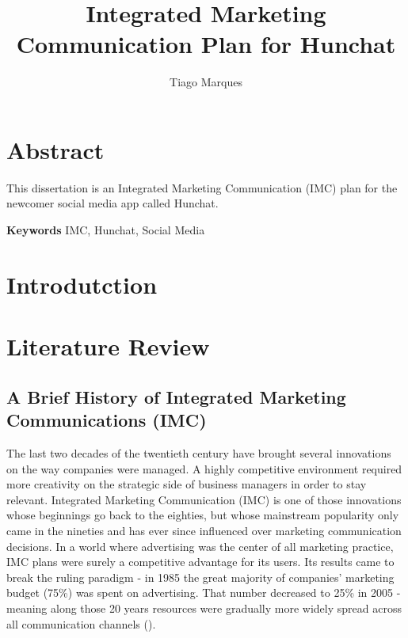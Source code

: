 \documentclass[11pt]{article}
\begin{document}
 

\begin{titlepage}
\title{Integrated Marketing Communication Plan for Hunchat}
\author{Tiago Marques}
\maketitle
\end{titlepage}


\section*{Abstract}
This dissertation is an Integrated Marketing Communication (IMC) plan for the newcomer social media app called Hunchat.
  \par
 \textbf{Keywords} IMC, Hunchat, Social Media
\cleardoublepage

\thispagestyle{empty}

\tableofcontents
\cleardoublepage 
\listoffigures
\listoftables 
\thispagestyle{empty}
\cleardoublepage 
\setcounter{page}{1}
 
\section{Introdutction}\label{intro}

\newpage	
\section{Literature Review}\label{review}
\subsection{A Brief History of Integrated Marketing Communications (IMC)}\label{IMC}
The last two decades of the twentieth century have brought several innovations on the way companies were managed. A highly competitive environment required more creativity on the strategic side of business managers in order to stay relevant. Integrated Marketing Communication (IMC) is one of those innovations whose beginnings go back to the eighties, but whose mainstream popularity only came in the nineties and has ever since influenced over marketing communication decisions. In a world where advertising was the center of all marketing practice, IMC plans were surely a competitive advantage for its users. Its results came to break the ruling paradigm - in 1985 the great majority  of companies' marketing budget (75\%) was spent on advertising. That number decreased to 25\% in 2005 - meaning along those 20 years resources were gradually more widely spread across all communication channels (\cite{holm}).  
\end{document}
